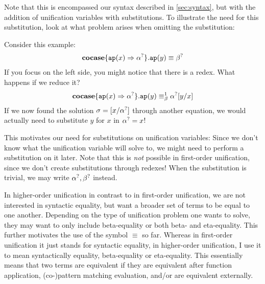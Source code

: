 \documentclass[twoside,12pt,a4paper]{article}
\begin{document}
Note that this is encompassed our syntax described in \ref{sec:syntax},
but with the addition of unification variables with substitutions. 
To illustrate the need for this substitution, look at what problem arises when omitting the substitution:
\begin{example} 
    Consider this example:
    \begin{align*}
        \textbf{cocase}\{\texttt{ap}(x)\Rightarrow\alpha^?\}.\texttt{ap}(y)\equiv\beta^?
    \end{align*}
    If you focus on the left side, you might notice that there is a redex. What happens if we reduce it?
    \begin{align*}
        \textbf{cocase}\{\texttt{ap}(x)\Rightarrow\alpha^?\}.\texttt{ap}(y)\equiv_{\beta}^1\alpha^?[y/x]    
    \end{align*}     
    If we now found the solution $\sigma = [x/ \alpha^?]$ through another equation, we would actually need to substitute $y$ for $x$ in $\alpha^? = x$!
\end{example}

This motivates our need for substitutions on unification variables: 
Since we don't know what the unification variable will solve to, we might need to perform a substitution on it later.
Note that this is \textit{not} possible in first-order unification, since we don't create substitutions through redexes! 
When the substitution is trivial, we may  write $\alpha^?, \beta^?$ instead.

In higher-order unification in contrast to in first-order unification, we are not interested in syntactic equality, but want a broader set of terms to be equal to one another.
Depending on the type of unification problem one wants to solve, they may want to only include beta-equality or both 
beta- and eta-equality.
This further motivates the use of the symbol $\equiv$ so far. Whereas in first-order unification it just stands for syntactic equality, 
in higher-order unification, I use it to mean syntactically equality, beta-equality or eta-equality.
This essentially means that two terms are equivalent if they are equivalent after function application, (co-)pattern matching evaluation, and/or are equivalent externally.
\end{document}

